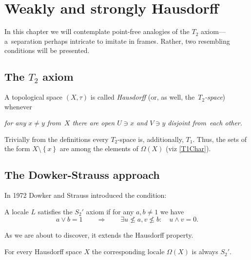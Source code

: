\chapter{Weakly and strongly Hausdorff}

In this chapter we will contemplate point-free analogies of the $T_2$
axiom---a~separation perhaps intricate to imitate in frames.
Rather, two resembling conditions will be presented.

\section{The $T_2$ axiom}

\begin{framed}
  \begin{df}[$T_2$]
    A topological space $(X, \tau)$ is called \emph{Hausdorff\/} (or, as well,
    the~\emph{$T_2$-space\/}) whenever
    \begin{center} \it
      for any $x \ne y$ from~$X$ there are open $U\owns x$ and $V\owns y$
      disjoint from~each other.
    \end{center}
  \end{df}
\end{framed}

\begin{rem} \label{T2->T1}
  Trivially from the definitions every $T_2$-space is, additionally, $T_1$.
  Thus, the sets of the form $X\setminus \left\{x\right\}$ are among the
  elements of $\Omega(X)$ (viz \ref{T1Char}).
\end{rem}

\section{The Dowker-Strauss approach}

In 1972 Dowker and Strauss \cite{ds72} introduced the condition:

\begin{framed}
  \begin{df}[$S_2'$]
    A locale $L$ satisfies the $S_2'$ axiom if for any $a, b \ne 1$ we have
    \[
      a \vee b = 1 \qquad \Rightarrow \qquad \exists u\not\leq a, v\not\leq
      b: \quad u \wedge v = 0.
    \]
  \end{df}
\end{framed}

As we are about to discover, it extends the Hausdorff property.

\begin{prop} \label{Haus->S2'}
  For every Hausdorff space $X$ the corresponding locale $\Omega(X)$ is always
  $S_2'$.
\end{prop}

